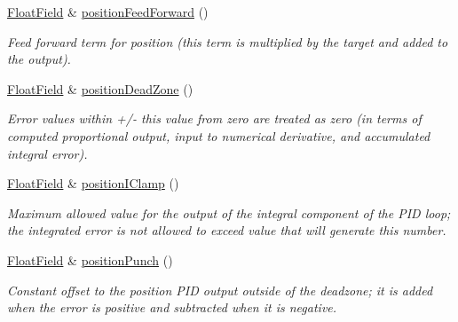 \begin{DoxyCompactItemize}
\hyperlink{classhebi_1_1Command_1_1FloatField}{Float\+Field} \& \hyperlink{classhebi_1_1Command_1_1Settings_1_1Actuator_1_1PositionGains_ab8e771ec96b728d1fda38f8d1ecba7dd}{position\+Feed\+Forward} ()
\begin{DoxyCompactList}\small\item\em Feed forward term for position (this term is multiplied by the target and added to the output). \end{DoxyCompactList}\item 
\mbox{\label{classhebi_1_1Command_1_1Settings_1_1Actuator_1_1PositionGains_a074cdcff244cca024fd52d3b2d748e9c}} 
\hyperlink{classhebi_1_1Command_1_1FloatField}{Float\+Field} \& \hyperlink{classhebi_1_1Command_1_1Settings_1_1Actuator_1_1PositionGains_a074cdcff244cca024fd52d3b2d748e9c}{position\+Dead\+Zone} ()
\begin{DoxyCompactList}\small\item\em Error values within +/-\/ this value from zero are treated as zero (in terms of computed proportional output, input to numerical derivative, and accumulated integral error). \end{DoxyCompactList}\item 
\mbox{\label{classhebi_1_1Command_1_1Settings_1_1Actuator_1_1PositionGains_a27a970858bd6ca1c4d8b7b99d49c6558}} 
\hyperlink{classhebi_1_1Command_1_1FloatField}{Float\+Field} \& \hyperlink{classhebi_1_1Command_1_1Settings_1_1Actuator_1_1PositionGains_a27a970858bd6ca1c4d8b7b99d49c6558}{position\+I\+Clamp} ()
\begin{DoxyCompactList}\small\item\em Maximum allowed value for the output of the integral component of the P\+ID loop; the integrated error is not allowed to exceed value that will generate this number. \end{DoxyCompactList}\item 
\mbox{\label{classhebi_1_1Command_1_1Settings_1_1Actuator_1_1PositionGains_ab2a896cf7246703211ae6c5bef75b1c6}} 
\hyperlink{classhebi_1_1Command_1_1FloatField}{Float\+Field} \& \hyperlink{classhebi_1_1Command_1_1Settings_1_1Actuator_1_1PositionGains_ab2a896cf7246703211ae6c5bef75b1c6}{position\+Punch} ()
\begin{DoxyCompactList}\small\item\em Constant offset to the position P\+ID output outside of the deadzone; it is added when the error is positive and subtracted when it is negative. \end{DoxyCompactList}\item 

\end{DoxyCompactItemize}
